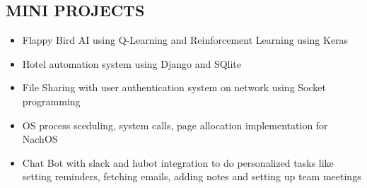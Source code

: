 \documentclass[letterpaper]{twentysecondcv} %
\begin{document}

\subsection{MINI PROJECTS}
\begin{itemize}
\item Flappy Bird AI using Q-Learning and Reinforcement Learning using Keras %
\item Hotel automation system using Django and SQlite
\item File Sharing with user authentication system on network using Socket programming
\item OS process sceduling, system calls, page allocation implementation for NachOS
\item Chat Bot with slack and hubot integration to do personalized tasks like setting reminders, fetching emails, adding notes and setting up team meetings
\end{itemize}








\end{document}
